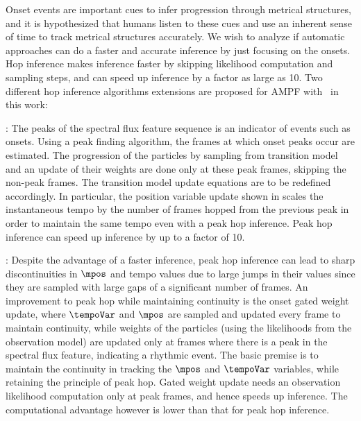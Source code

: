 Onset events are important cues to infer progression through metrical structures, and it is hypothesized that humans listen to these cues and use an inherent sense of time to track metrical structures accurately. We wish to analyze if automatic approaches can do a faster and accurate inference by just focusing on the onsets. Hop inference makes inference faster by skipping likelihood computation and sampling steps, and can speed up inference by a factor as large as 10. Two different hop inference algorithms extensions are proposed for \gls{AMPF} with \bpmodel\ in this work: 
\begin{description}[leftmargin=1em]
 \item[Peak Hop Inference (\pfpkhop)]: The peaks of the spectral flux feature sequence is an indicator of events such as onsets. Using a peak finding algorithm, the frames at which onset peaks occur are estimated. The progression of the particles by sampling from transition model and an update of their weights are done only at these peak frames, skipping the non-peak frames. The transition model update equations  are to be redefined accordingly. In particular, the position variable update shown in  scales the instantaneous tempo by the number of frames hopped from the previous peak in order to maintain the same tempo even with a peak hop inference. Peak hop inference can speed up inference by up to a factor of 10. 
 \item[Onset gated weight update (\pfobshop)]: Despite the advantage of a faster inference, peak hop inference can lead to sharp discontinuities in $\mpos$ and tempo values due to large jumps in their values since they are sampled with large gaps of a significant number of frames. An improvement to peak hop while maintaining continuity is the onset gated weight update, where $\tempoVar$ and $\mpos$ are sampled and updated every frame to maintain continuity, while weights of the particles (using the likelihoods from the observation model) are updated only at frames where there is a peak in the spectral flux feature, indicating a rhythmic event. The basic premise is to maintain the continuity in tracking the $\mpos$ and $\tempoVar$ variables, while retaining the principle of peak hop. Gated weight update needs an observation likelihood computation only at peak frames, and hence speeds up inference. The computational advantage however is lower than that for peak hop inference. 
\end{description}
